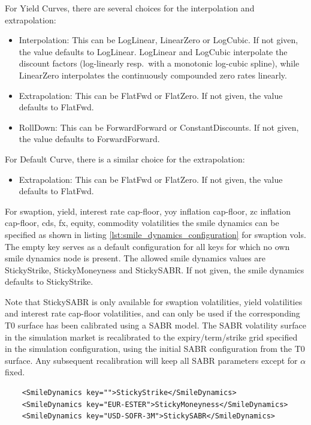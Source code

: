 For Yield Curves, there are several choices for the interpolation and extrapolation:
\begin{itemize}
\item Interpolation: This can be LogLinear, LinearZero or LogCubic. If not given, the value defaults to LogLinear. LogLinear and LogCubic interpolate the discount factors (log-linearly resp.\ with a monotonic log-cubic spline), while LinearZero interpolates the continuously compounded zero rates linearly.
\item Extrapolation: This can be FlatFwd or FlatZero. If not given, the value defaults to FlatFwd.
\item RollDown: This can be ForwardForward or ConstantDiscounts. If not given, the value defaults to ForwardForward.
\end{itemize}

For Default Curve, there is a similar choice for the extrapolation:
\begin{itemize}
\item Extrapolation: This can be FlatFwd or FlatZero. If not given, the value defaults to FlatFwd.
\end{itemize}

For swaption, yield, interest rate cap-floor, yoy inflation cap-floor, zc inflation cap-floor, cds, fx, equity, commodity
volatilities the smile dynamics can be specified as shown in listing \ref{lst:smile_dynamics_configuration} for swaption
vols. The empty key serves as a default configuration for all keys for which no own smile dynamics node is present. The
allowed smile dynamics values are StickyStrike, StickyMoneyness and StickySABR.
If not given, the smile dynamics defaults to StickyStrike.

Note that StickySABR is only available for swaption volatilities, yield volatilities and interest rate cap-floor volatilities,
and can only be used if the corresponding T0 surface has been calibrated using a SABR model.
The SABR volatility surface in the simulation market is recalibrated to the expiry/term/strike grid specified in the simulation
configuration, using the initial SABR configuration from the T0 surface. Any subsequent recalibration will keep all SABR parameters
except for $\alpha$ fixed.
\begin{listing}
  \begin{verbatim}
    <SmileDynamics key="">StickyStrike</SmileDynamics>
    <SmileDynamics key="EUR-ESTER">StickyMoneyness</SmileDynamics>
    <SmileDynamics key="USD-SOFR-3M">StickySABR</SmileDynamics>
  \end{verbatim}
\caption{Smile Configuration Node}
\label{lst:smile_dynamics_configuration}
\end{listing}

